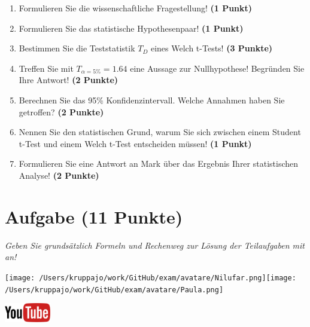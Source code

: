 \documentclass[a4paper, 9pt]{scrartcl}\usepackage[]{graphicx}\usepackage[]{xcolor}
\begin{document}
\begin{enumerate}
  \item Formulieren Sie die wissenschaftliche Fragestellung! \textbf{(1 Punkt)}
  \item Formulieren Sie das statistische Hypothesenpaar! \textbf{(1 Punkt)}
  \item Bestimmen Sie die Teststatistik $T_{D}$ eines  Welch t-Tests! \textbf{(3 Punkte)}
  \item Treffen Sie mit $T_{\alpha = 5\%} = 1.64$ eine Aussage zur Nullhypothese! Begründen Sie Ihre Antwort! \textbf{(2 Punkte)}
\item Berechnen Sie das 95\% Konfidenzintervall. Welche Annahmen haben Sie getroffen? \textbf{(2 Punkte)}
\item Nennen Sie den statistischen Grund, warum Sie sich zwischen einem Student t-Test und einem Welch t-Test entscheiden müssen! \textbf{(1 Punkt)}
\item Formulieren Sie eine Antwort an Mark über das Ergebnis Ihrer statistischen Analyse! \textbf{(2 Punkte)}
\end{enumerate} 
\clearpage

\section{Aufgabe \hfill (11 Punkte)}

\textit{Geben Sie grundsätzlich Formeln und Rechenweg zur Lösung der Teilaufgaben mit an!} \\[1Ex]
 

 
\begin{minipage}[t]{0.5\textwidth}
\texttt{[image: /Users/kruppajo/work/GitHub/exam/avatare/Nilufar.png]}\hspace{-4mm}\texttt{[image: /Users/kruppajo/work/GitHub/exam/avatare/Paula.png]}
\end{minipage}
\begin{minipage}[t]{0.5\textwidth}
\hfill
\href{https://youtu.be/QR90zyn0Iz8}{\includegraphics[width = 2cm]{img/youtube}}
\end{minipage}
\vspace{1ex}
\end{document}
